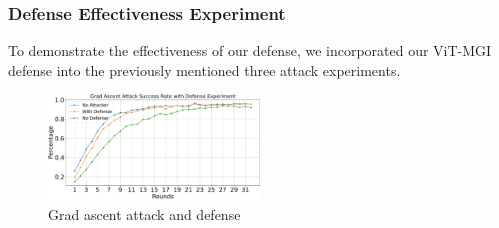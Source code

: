 \documentclass[conference]{IEEEtran}
\def\figGradAscentAttackDefense{0.5\textwidth}
\begin{document}


\subsubsection{\textbf{Defense Effectiveness Experiment}}
\label{exp:defenseEffectiveness}


To demonstrate the effectiveness of our defense, we incorporated our ViT-MGI defense into the previously mentioned three attack experiments.

\begin{figure}[htbp]
    \centerline{\includegraphics[width=\figGradAscentAttackDefense]{pics/004-gradAttack-attackRate=1-withDefense.pdf}}
    \vspace{-10px}  %
    \caption{Grad ascent attack and defense\vspace{-8px}}
    \label{fig:gradAscentDefense}
\end{figure}

\end{document}
